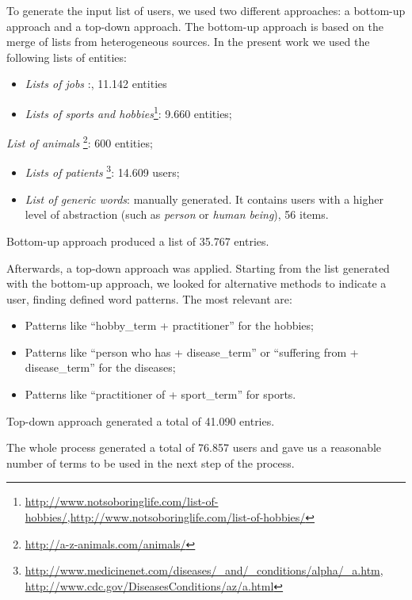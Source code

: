\documentclass[]{book}
\providecommand{\tightlist}{%
  \setlength{\itemsep}{0pt}\setlength{\parskip}{0pt}}
\let\rmarkdownfootnote\footnote%
\def\footnote{\protect\rmarkdownfootnote}
\begin{document}
To generate the input list of users, we used two different approaches: a
bottom-up approach and a top-down approach. The bottom-up approach is
based on the merge of lists from heterogeneous sources. In the present
work we used the following lists of entities:

\begin{itemize}
\item
  \emph{Lists of jobs} :\citep{listjobs}, 11.142 entities
\item
  \emph{Lists of sports and hobbies}\footnote{\url{http://www.notsoboringlife.com/list-of-hobbies/,http://www.notsoboringlife.com/list-of-hobbies/}}:
  9.660 entities;
\end{itemize}

\emph{List of animals} \footnote{\url{http://a-z-animals.com/animals/}}:
600 entities;

\begin{itemize}
\item
  \emph{Lists of patients} \footnote{\url{http://www.medicinenet.com/diseases/_and/_conditions/alpha/_a.htm},
    \url{http://www.cdc.gov/DiseasesConditions/az/a.html}}: 14.609
  users;
\item
  \emph{List of generic words}: manually generated. It contains users
  with a higher level of abstraction (such as \emph{person} or
  \emph{human being}), 56 items.
\end{itemize}

Bottom-up approach produced a list of 35.767 entries.

Afterwards, a top-down approach was applied. Starting from the list
generated with the bottom-up approach, we looked for alternative methods
to indicate a user, finding defined word patterns. The most relevant
are:

\begin{itemize}
\tightlist
\item
  Patterns like ``hobby\_term + practitioner'' for the hobbies;
\item
  Patterns like ``person who has + disease\_term'' or ``suffering from +
  disease\_term'' for the diseases;
\item
  Patterns like ``practitioner of + sport\_term'' for sports.
\end{itemize}

Top-down approach generated a total of 41.090 entries.

The whole process generated a total of 76.857 users and gave us a
reasonable number of terms to be used in the next step of the process.
\end{document}
